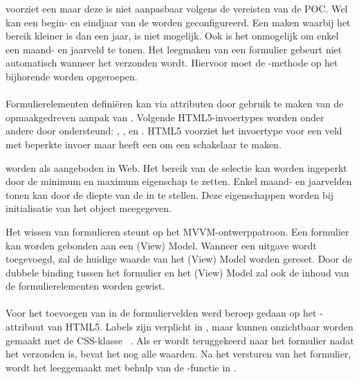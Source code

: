 \st{} voorziet een  maar deze is niet aanpasbaar volgens de vereisten van de POC.
Wel kan een begin- en eindjaar van de  worden geconfigureerd.
Een  maken waarbij het bereik kleiner is dan een jaar, is niet mogelijk.
Ook is het onmogelijk om enkel een maand- en jaarveld te tonen.
Het leegmaken van een formulier gebeurt niet automatisch wanneer het verzonden wordt.
Hiervoor moet de -methode op het bijhorende  worden opgeroepen.

\paragraph{\kendo}
 Formulierelementen definiëren kan via attributen door gebruik te maken van de opmaakgedreven aanpak van \kendo.
 Volgende HTML5-invoertypes worden onder andere door \kendo{} ondersteund:  , ,  en .
 HTML5 voorziet het invoertype  voor een veld met beperkte invoer maar \kendo{} heeft een  om een schakelaar te maken.

  worden als  aangeboden in \kendo{} Web.
 Het bereik van de selectie kan worden ingeperkt door de minimum en maximum eigenschap te zetten.
 Enkel maand- en jaarvelden tonen kan door de diepte van de  in te stellen.
 Deze eigenschappen worden bij initialisatie van het object meegegeven.
 
 Het wissen van formulieren steunt op het MVVM-ontwerppatroon.
 Een formulier kan worden gebonden aan een (View) Model.
 Wanneer een uitgave wordt toegevoegd, zal de huidige waarde van het (View) Model worden gereset.
 Door de dubbele binding tussen het formulier en het (View) Model zal ook de inhoud van de formulierelementen worden gewist.
 
\paragraph{\jqm} 
Voor het toevoegen van  in de formuliervelden werd beroep gedaan op het -attribuut van HTML5. 
Labels zijn verplicht in \jqm{}, maar kunnen onzichtbaar worden gemaakt met de CSS-klasse ~\cite{JQuery2013}. 
Als er wordt teruggekeerd naar het formulier nadat het verzonden is, bevat het nog alle waarden. 
Na het versturen van het formulier, wordt het leeggemaakt met behulp van de -functie in \js{}.
 

